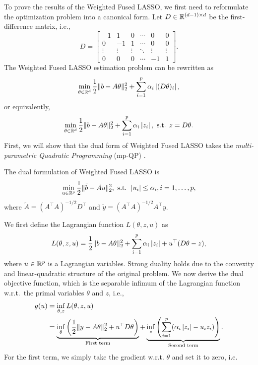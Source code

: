 To prove the results of the Weighted Fused LASSO, we first need to reformulate the optimization problem into a canonical form. Let $D \in \mathbb{R}^{(d - 1) \times d}$ be the first-difference matrix, i.e., 
\[
    D = \begin{bmatrix}
        -1 & 1 & 0 & \cdots & 0 & 0 \\
        0 & -1 & 1 & \cdots & 0 & 0 \\
        \vdots & \vdots & \vdots & \ddots & \vdots & \vdots \\
        0 & 0 & 0 & \cdots & -1 & 1
        \end{bmatrix}.
\]
The Weighted Fused LASSO estimation problem can be rewritten as
\[
    \min_{\theta \in \mathbb{R}^d} \frac{1}{2}\|b - A\theta\|_2^2 + \sum_{i = 1}^p\alpha_i\left| (D\theta)_i \right|,
\]
or equivalently, 
\[
    \min_{\theta \in \mathbb{R}^d} \frac{1}{2}\|b - A\theta\|_2^2 + \sum_{i = 1}^p\alpha_i\left| z_i \right|, \textup{ s.t. } z = D\theta.
\]
First, we will show that the dual form of Weighted Fused LASSO takes the \textit{multi-parametric Quadratic Programming} (mp-QP) \citep{bemporad2002explicit}.
\begin{proposition}
    The dual formulation of Weighted Fused LASSO is
    \[
        \min_{u \in \mathbb{R}^p} \frac{1}{2} \|\tilde{b} - \tilde{A}u\|_2^2, \textup{ s.t. } \left| u_i \right| \leq \alpha_i, i = 1, \dots, p,
    \]
    where $\tilde{A} = (A^\top A)^{-1/2}D^\top$ and $\tilde{y} = (A^\top A)^{-1/2}A^\top y$.
\end{proposition}
\proof
    We first define the Lagrangian function $L(\theta, z, u)$ as 
    \[
        L(\theta, z, u) = \frac{1}{2}\|b - A\theta\|_2^2 + \sum_{i = 1}^p\alpha_i\left| z_i \right| + u^\top(D\theta - z),
    \]
    where $u \in \mathbb{R}^p$ is a Lagrangian variables. Strong duality holds due to the convexity and linear-quadratic structure of the original problem. We now derive the dual objective function, which is the separable infimum of the Lagrangian function w.r.t.~the primal variables $\theta$ and $z$, i.e.,
    \begin{equation*}
        \begin{aligned}
            g(u) &= \inf_{\theta, z}L(\theta, z, u) \\
            &= \underbrace{\inf_{\theta}\left(\frac{1}{2}\|y - A\theta\|_2^2 + u^\top D\theta\right)}_{\textup{First term}} + \underbrace{\inf_{z}\left(\sum_{i = 1}^p(\alpha_i\left| z_i \right| - u_iz_i)\right)}_{\textup{Second term}}.
            \end{aligned}
    \end{equation*}
    For the first term, we simply take the gradient w.r.t. $\theta$ and set it to zero, i.e.
